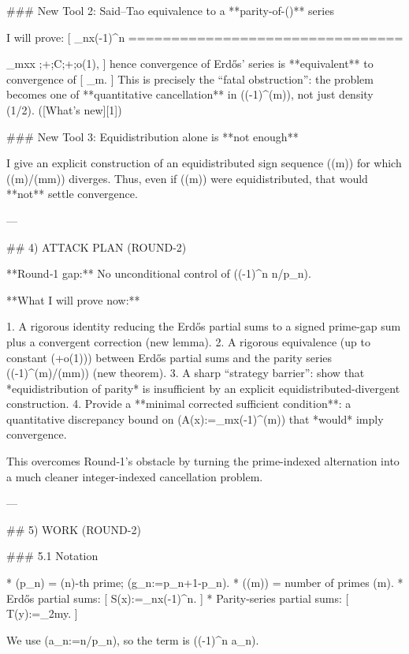 ### New Tool 2: Said–Tao equivalence to a **parity-of-(\pi)** series

I will prove:
[
\sum_{n\le x}(-1)^n
================================

\sum_{m\le x\log x}
;+;C;+;o(1),
]
hence convergence of Erdős’ series is **equivalent** to convergence of
[
\sum_{m}.
]
This is precisely the “fatal obstruction”: the problem becomes one of **quantitative cancellation** in ((-1)^{\pi(m)}), not just density (1/2). ([What's new][1])

### New Tool 3: Equidistribution alone is **not enough**

I give an explicit construction of an equidistributed sign sequence (\varepsilon(m)) for which (\sum \varepsilon(m)/(m\log m)) diverges. Thus, even if (\pi(m)) were equidistributed, that would **not** settle convergence.

---

## 4) ATTACK PLAN (ROUND-2)

**Round‑1 gap:** No unconditional control of (\sum (-1)^n n/p_n).

**What I will prove now:**

1. A rigorous identity reducing the Erdős partial sums to a signed prime-gap sum plus a convergent correction (new lemma).
2. A rigorous equivalence (up to constant (+o(1))) between Erdős partial sums and the parity series (\sum (-1)^{\pi(m)}/(m\log m)) (new theorem).
3. A sharp “strategy barrier”: show that *equidistribution of parity* is insufficient by an explicit equidistributed-divergent construction.
4. Provide a **minimal corrected sufficient condition**: a quantitative discrepancy bound on (A(x):=\sum_{m\le x}(-1)^{\pi(m)}) that *would* imply convergence.

This overcomes Round‑1’s obstacle by turning the prime-indexed alternation into a much cleaner integer-indexed cancellation problem.

---

## 5) WORK (ROUND-2)

### 5.1 Notation

* (p_n) = (n)-th prime; (g_n:=p_{n+1}-p_n).
* (\pi(m)) = number of primes (\le m).
* Erdős partial sums:
  [
  S(x):=\sum_{n\le x}(-1)^n.
  ]
* Parity-series partial sums:
  [
  T(y):=\sum_{2\le m\le y}.
  ]

We use (a_n:=n/p_n), so the term is ((-1)^n a_n).

